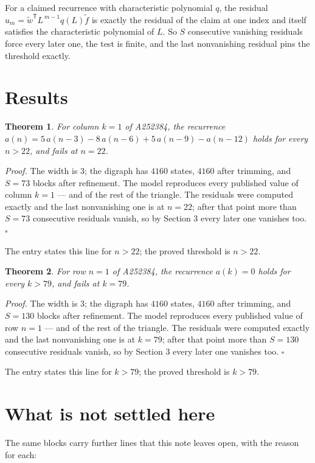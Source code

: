 \documentclass[11pt]{article}
\newtheorem{theorem}{Theorem}
\theoremstyle{definition}
\begin{document}
For a claimed recurrence with characteristic polynomial $q$, the residual $u_m = \tilde w^{\mathsf T}L^{\,m-1}q(L)\tilde f$ is exactly the residual of the claim at one index and itself satisfies the characteristic polynomial of $L$. So $S$ consecutive vanishing residuals force every later one, the test is finite, and the last nonvanishing residual pins the threshold exactly.

\section{Results}

\begin{theorem} For column $k = 1$ of A252384, the recurrence $a(n) = 5\,a(n-3) - 8\,a(n-6) + 5\,a(n-9) - a(n-12)$ holds for every $n > 22$, and fails at $n = 22$.\end{theorem}

{\itshape Proof.} The width is $3$; the digraph has $4160$ states, $4160$ after trimming, and $S = 73$ blocks after refinement. The model reproduces every published value of column $k = 1$ --- and of the rest of the triangle. The residuals were computed exactly and the last nonvanishing one is at $n = 22$; after that point more than $S = 73$ consecutive residuals vanish, so by Section 3 every later one vanishes too. $\square$

The entry states this line for $n > 22$; the proved threshold is $n > 22$.

\begin{theorem} For row $n = 1$ of A252384, the recurrence $a(k) = 0$ holds for every $k > 79$, and fails at $k = 79$.\end{theorem}

{\itshape Proof.} The width is $3$; the digraph has $4160$ states, $4160$ after trimming, and $S = 130$ blocks after refinement. The model reproduces every published value of row $n = 1$ --- and of the rest of the triangle. The residuals were computed exactly and the last nonvanishing one is at $k = 79$; after that point more than $S = 130$ consecutive residuals vanish, so by Section 3 every later one vanishes too. $\square$

The entry states this line for $k > 79$; the proved threshold is $k > 79$.

\section{What is not settled here}

The same blocks carry further lines that this note leaves open, with the reason for each:
\end{document}
